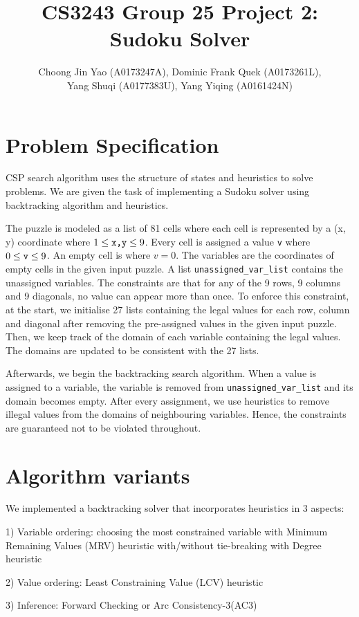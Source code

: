 \documentclass[runningheads]{llncs}
\title{CS3243 Group 25 Project 2: Sudoku Solver}
\author{Choong Jin Yao (A0173247A), Dominic Frank Quek (A0173261L),\\ Yang Shuqi (A0177383U), Yang Yiqing (A0161424N)}
\institute{National University of Singapore}
\begin{document}
\maketitle

\section{Problem Specification}
CSP search algorithm uses the structure of states and heuristics to solve problems. We are given the task of implementing a Sudoku solver using backtracking algorithm and heuristics. 

The puzzle is modeled as a list of 81 cells where each cell is represented by a (x, y) coordinate where $ 1\leq \verb`x,y` \leq 9$. Every cell is assigned a value \verb`v` where  $ 0\leq \verb`v` \leq 9$. An empty cell is where $v = 0$. The variables are the coordinates of empty cells in the given input puzzle. A list \verb`unassigned_var_list` contains the unassigned variables. The constraints are that for any of the 9 rows, 9 columns and 9 diagonals, no value can appear more than once. To enforce this constraint, at the start, we initialise 27 lists containing the legal values for each row, column and diagonal after removing the pre-assigned values in the given input puzzle. Then, we keep track of the domain of each variable containing the legal values. The domains are updated to be consistent with the 27 lists. 

Afterwards, we begin the backtracking search algorithm. When a value is assigned to a variable, the variable is removed from \verb`unassigned_var_list` and its domain becomes empty. After every assignment, we use heuristics to remove illegal values from the domains of neighbouring variables. Hence, the constraints are guaranteed not to be violated throughout.

\section{Algorithm variants}
We implemented a backtracking solver that incorporates heuristics in 3 aspects: 

1) Variable ordering: choosing the most constrained variable with Minimum Remaining Values (MRV) heuristic with/without tie-breaking with Degree heuristic

2) Value ordering: Least Constraining Value (LCV) heuristic 

3) Inference: Forward Checking or Arc Consistency-3(AC3)
\end{document}
